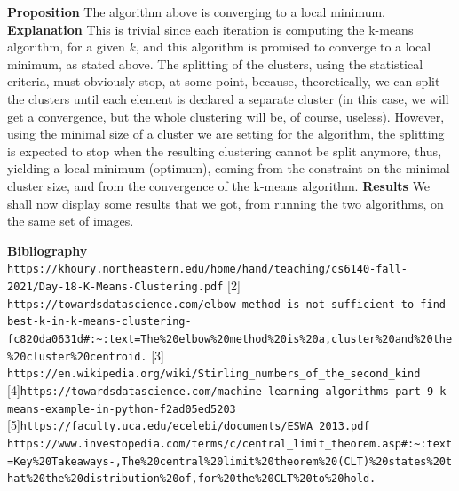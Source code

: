 \documentclass[12pt]{article}
\begin{document}
\newpage
\textbf{Proposition} The algorithm above is converging to a local minimum.\newline
\textbf{Explanation} This is trivial since each iteration is computing the k-means algorithm, for a given $k$, and this algorithm is promised to converge to a local minimum, as stated above. \newline
The splitting of the clusters, using the statistical criteria, must obviously stop, at some point, because, theoretically, we can split the clusters until each element is declared a separate cluster (in this case, we will get a convergence, but the whole clustering will be, of course, useless). However, using the minimal size of a cluster we are setting for the algorithm, the splitting is expected to stop when the resulting clustering cannot be split anymore, thus, yielding a local minimum (optimum), coming from the constraint on the minimal cluster size, and from the convergence of the k-means algorithm. \newline
\newpage
\textbf{Results}
We shall now display some results that we got, from running the two algorithms, on the same set of images. \newline

\newpage
\textbf{Bibliography} \newline
[1] \verb|https://khoury.northeastern.edu/home/hand/teaching/cs6140-fall-2021/Day-18-K-Means-Clustering.pdf|
[2] \verb|https://towardsdatascience.com/elbow-method-is-not-sufficient-to-find-best-k-in-k-means-clustering-fc820da0631d#:~:text=The%20elbow%20method%20is%20a,cluster%20and%20the%20cluster%20centroid.|
[3] \verb|https://en.wikipedia.org/wiki/Stirling_numbers_of_the_second_kind|
[4]\verb|https://towardsdatascience.com/machine-learning-algorithms-part-9-k-means-example-in-python-f2ad05ed5203|
[5]\verb|https://faculty.uca.edu/ecelebi/documents/ESWA_2013.pdf| \newline
[6]\verb|https://www.investopedia.com/terms/c/central_limit_theorem.asp#:~:text=Key%20Takeaways-,The%20central%20limit%20theorem%20(CLT)%20states%20that%20the%20distribution%20of,for%20the%20CLT%20to%20hold.|
\end{document}

